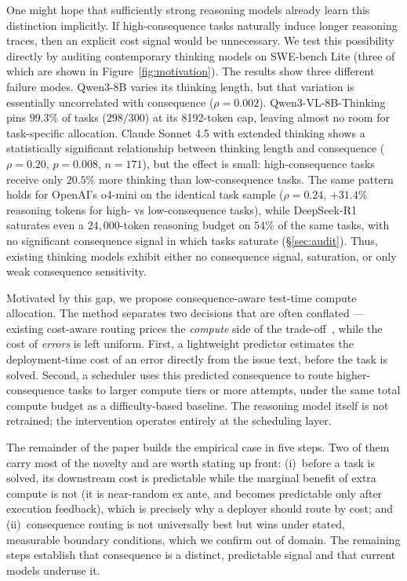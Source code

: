 \documentclass{article}
\begin{document}
One might hope that sufficiently strong reasoning models already learn
this distinction implicitly. If high-consequence tasks naturally induce
longer reasoning traces, then an explicit cost signal would be unnecessary. We test this possibility directly by
auditing contemporary thinking models on SWE-bench Lite (three of
which are shown in Figure~\ref{fig:motivation}). The results show three different failure
modes. Qwen3-8B varies its thinking length, but that variation is
essentially uncorrelated with consequence
($\rho = 0.002$). Qwen3-VL-8B-Thinking pins $99.3\%$ of tasks ($298/300$) at its
8192-token cap, leaving almost no room for task-specific allocation.
Claude Sonnet 4.5 with extended thinking shows a statistically
significant relationship between thinking length and consequence
($\rho = 0.20$, $p = 0.008$, $n = 171$), but the effect is small:
high-consequence tasks receive only $20.5\%$ more thinking than
low-consequence tasks. The same pattern holds for OpenAI's o4-mini on
the identical task sample ($\rho = 0.24$, $+31.4\%$ reasoning tokens
for high- vs low-consequence tasks), while DeepSeek-R1 saturates even
a $24{,}000$-token reasoning budget on $54\%$ of the same tasks, with
no significant consequence signal in which tasks saturate
(\S\ref{sec:audit}).
Thus, existing thinking models exhibit either no
consequence signal, saturation, or only weak consequence sensitivity.

Motivated by this gap, we propose consequence-aware test-time
compute allocation.
The method separates two decisions that are often conflated ---
existing cost-aware routing prices the \emph{compute} side of the
trade-off~\citep{shirkavand2025costaware}, while the cost of
\emph{errors} is left uniform.
First, a lightweight predictor estimates the deployment-time
cost of an error directly from the issue text, before the task is
solved.
Second, a scheduler uses this predicted consequence to route
higher-consequence tasks to larger compute tiers or more attempts,
under the same total compute budget as a difficulty-based baseline.
The reasoning model itself is not retrained;
the intervention operates entirely at the scheduling layer.

The remainder of the paper builds the empirical case in five steps.
Two of them carry most of the novelty and are worth stating up front:
(i)~before a task is solved, its downstream cost is predictable while
the marginal benefit of extra compute is not (it is near-random ex
ante, and becomes predictable only after execution feedback), which is
precisely why a deployer should route by cost; and (ii)~consequence
routing is not universally best but wins under stated, measurable
boundary conditions, which we confirm out of domain. The remaining
steps establish that consequence is a distinct, predictable signal and
that current models underuse it.
\end{document}
